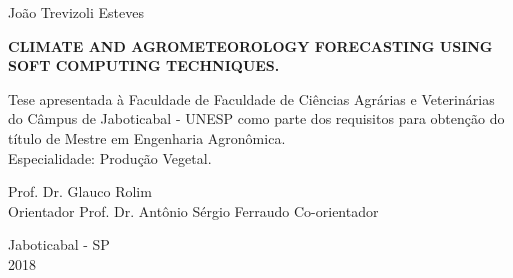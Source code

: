 \clearpage

\thispagestyle{empty}

\centerline{{\normalsize{João Trevizoli Esteves}}}

\vspace*{4.5cm}


\begin{center}
\Large\textrm{\textbf{
CLIMATE AND AGROMETEOROLOGY FORECASTING USING SOFT COMPUTING TECHNIQUES.}} %
\end{center}
\vspace*{5cm}

\hspace*{7.3cm} 
\begin{minipage}[b]{0.45\linewidth}
  \begin{espacosimples}
    Tese apresentada à Faculdade de Faculdade de Ciências Agrárias e Veterinárias do Câmpus de Jaboticabal - UNESP como parte dos requisitos para obtenção do título de Mestre em Engenharia Agronômica. \\
Especialidade: Produção Vegetal.
  \end{espacosimples}
\end{minipage}


\vspace*{0.5cm}

\begin{flushleft}
\begin{espacosimples}
\normalsize
\hspace*{8.0cm} Prof. Dr. Glauco Rolim \\[0.5ex]
\hspace*{8.0cm} Orientador
\hspace*{8.0cm} Prof. Dr. Antônio Sérgio Ferraudo
\hspace*{8.0cm} Co-orientador
\end{espacosimples}
\end{flushleft}


\vspace*{2.0cm}
\begin{center}
Jaboticabal - SP\\ 2018
\end{center}

